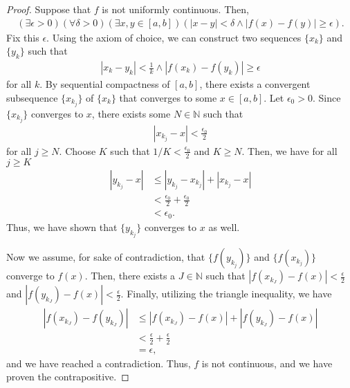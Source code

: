 \documentclass[10pt,a4paper]{article}
\theoremstyle{theorem}
\theoremstyle{definition}
\begin{document}
\begin{proof}
Suppose that $f$ is not uniformly continuous. Then,
\begin{align*}
(\exists \epsilon > 0)(\forall \delta > 0)(\exists x,y \in [a, b])(|x - y| < \delta \land |f(x) - f(y)| \geq \epsilon).
\end{align*}
Fix this $\epsilon$. Using the axiom of choice, we can construct two sequences $\{x_k\}$ and $\{y_k\}$ such that 
\begin{align*}
|x_k - y_k| < \frac{1}{k} \land |f(x_k) - f(y_k)| \geq \epsilon
\end{align*}
for all $k$. By sequential compactness of $[a, b]$, there exists a convergent subsequence $\{x_{k_j} \}$ of $\{x_k\}$ that converges to some $x \in [a, b]$.  Let $ \epsilon_0 > 0$.  Since $\{x_{k_j} \}$ converges to $x$, there exists some $N \in \mathbb{N}$ such that 
\begin{align*}
|x_{k_j} - x| < \frac{\epsilon_0}{2}
\end{align*}
for all $j \geq N$. Choose $K$ such that $1/K < \frac{\epsilon_0}{2}$ and $K \geq N$. Then, we have for all $j \geq K$
\begin{align*}
|y_{k_j} - x| &\leq |y_{k_j} - x_{k_j}| + |x_{k_j} - x|\\
&< \frac{\epsilon_0}{2} + \frac{\epsilon_0}{2}\\
&<\epsilon_0.
\end{align*}
Thus, we have shown that $\{ y_{k_j} \}$ converges to $x$ as well. 

Now we assume, for sake of contradiction, that $\{f(y_{k_j}) \}$ and $\{f(x_{k_j}) \}$ converge to $f(x)$. Then, there exists a $J \in \mathbb{N}$ such that $|f(x_{k_J}) - f(x)| < \frac{\epsilon}{2}$ and $|f(y_{k_J}) - f(x)| < \frac{\epsilon}{2}$. Finally, utilizing the triangle inequality, we have
\begin{align*}
|f(x_{k_J}) - f(y_{k_J})| &\leq |f(x_{k_J}) - f(x)| + |f(y_{k_J}) - f(x)|\\
&< \frac{\epsilon}{2} + \frac{\epsilon}{2}\\
&= \epsilon,
\end{align*}
and we have reached a contradiction. Thus, $f$ is not continuous, and we have proven the contrapositive.
\end{proof}
\end{document}
